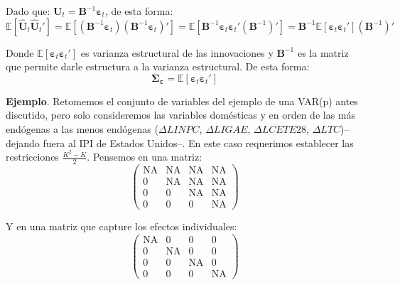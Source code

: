 \documentclass[
]{book}
\begin{document}
Dado que: \(\mathbf{U}_t = \mathbf{B}^{-1} \mathbf{\varepsilon}_t\), de esta forma:
\begin{equation*}
    \mathbb{E}[\hat{\mathbf{U}}_{t} \hat{\mathbf{U}}_{t}'] = \mathbb{E}[(\mathbf{B}^{-1} \mathbf{\varepsilon}_t)(\mathbf{B}^{-1} \mathbf{\varepsilon}_t)'] = \mathbb{E}[\mathbf{B}^{-1} \mathbf{\varepsilon}_t \mathbf{\varepsilon}_t' (\mathbf{B}^{-1})'] = \mathbf{B}^{-1} \mathbb{E}[\mathbf{\varepsilon}_t \mathbf{\varepsilon}_t'] (\mathbf{B}^{-1})'
\end{equation*}

Donde \(\mathbb{E}[\mathbf{\varepsilon}_t \mathbf{\varepsilon}_t']\) es varianza estructural de las innovaciones y \(\mathbf{B}^{-1}\) es la matriz que permite darle estructura a la varianza estructural. De esta forma:
\begin{equation*}
    \mathbf{\Sigma_{\varepsilon}} = \mathbb{E}[\mathbf{\varepsilon}_t \mathbf{\varepsilon}_t']
\end{equation*}

\textbf{Ejemplo}. Retomemos el conjunto de variables del ejemplo de una VAR(p) antes discutido, pero solo consideremos las variables domésticas y en orden de las más endógenas a las menos endógenas (\(\Delta LINPC\), \(\Delta LIGAE\), \(\Delta  LCETE28\), \(\Delta LTC\))--dejando fuera al IPI de Estados Unidos--. En este caso requerimos establecer las restricciones \(\frac{K^2 - K}{2}\). Pensemos en una matriz:
\begin{equation*}
    \begin{pmatrix}
    \text{NA} & \text{NA} & \text{NA} & \text{NA}\\
    0         & \text{NA} & \text{NA} & \text{NA}\\
    0         & 0         & \text{NA} & \text{NA}\\
    0         & 0         & 0         & \text{NA}
    \end{pmatrix}
\end{equation*}

Y en una matriz que capture los efectos individuales:
\begin{equation*}
    \begin{pmatrix}
    \text{NA} & 0 & 0 & 0 \\
    0         & \text{NA} & 0 & 0 \\
    0         & 0         & \text{NA} & 0 \\
    0         & 0         & 0         & \text{NA}
    \end{pmatrix}
\end{equation*}
\end{document}
